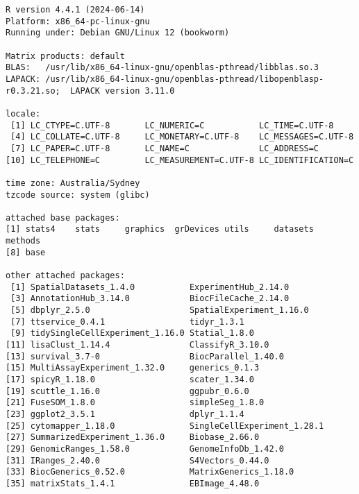 \documentclass[
  letterpaper,
  DIV=11,
  numbers=noendperiod]{scrreprt}
\begin{document}
\begin{verbatim}
R version 4.4.1 (2024-06-14)
Platform: x86_64-pc-linux-gnu
Running under: Debian GNU/Linux 12 (bookworm)

Matrix products: default
BLAS:   /usr/lib/x86_64-linux-gnu/openblas-pthread/libblas.so.3 
LAPACK: /usr/lib/x86_64-linux-gnu/openblas-pthread/libopenblasp-r0.3.21.so;  LAPACK version 3.11.0

locale:
 [1] LC_CTYPE=C.UTF-8       LC_NUMERIC=C           LC_TIME=C.UTF-8       
 [4] LC_COLLATE=C.UTF-8     LC_MONETARY=C.UTF-8    LC_MESSAGES=C.UTF-8   
 [7] LC_PAPER=C.UTF-8       LC_NAME=C              LC_ADDRESS=C          
[10] LC_TELEPHONE=C         LC_MEASUREMENT=C.UTF-8 LC_IDENTIFICATION=C   

time zone: Australia/Sydney
tzcode source: system (glibc)

attached base packages:
[1] stats4    stats     graphics  grDevices utils     datasets  methods  
[8] base     

other attached packages:
 [1] SpatialDatasets_1.4.0           ExperimentHub_2.14.0           
 [3] AnnotationHub_3.14.0            BiocFileCache_2.14.0           
 [5] dbplyr_2.5.0                    SpatialExperiment_1.16.0       
 [7] ttservice_0.4.1                 tidyr_1.3.1                    
 [9] tidySingleCellExperiment_1.16.0 Statial_1.8.0                  
[11] lisaClust_1.14.4                ClassifyR_3.10.0               
[13] survival_3.7-0                  BiocParallel_1.40.0            
[15] MultiAssayExperiment_1.32.0     generics_0.1.3                 
[17] spicyR_1.18.0                   scater_1.34.0                  
[19] scuttle_1.16.0                  ggpubr_0.6.0                   
[21] FuseSOM_1.8.0                   simpleSeg_1.8.0                
[23] ggplot2_3.5.1                   dplyr_1.1.4                    
[25] cytomapper_1.18.0               SingleCellExperiment_1.28.1    
[27] SummarizedExperiment_1.36.0     Biobase_2.66.0                 
[29] GenomicRanges_1.58.0            GenomeInfoDb_1.42.0            
[31] IRanges_2.40.0                  S4Vectors_0.44.0               
[33] BiocGenerics_0.52.0             MatrixGenerics_1.18.0          
[35] matrixStats_1.4.1               EBImage_4.48.0                 


\end{verbatim}
\end{document}
